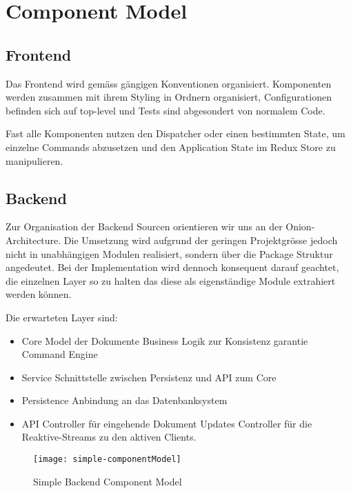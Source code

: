 \section{Component Model}



\subsection{Frontend}
Das Frontend wird gemäss gängigen Konventionen organisiert.
Komponenten werden zusammen mit ihrem Styling in Ordnern organisiert, Configurationen befinden sich auf top-level und Tests sind abgesondert von normalem Code.

Fast alle Komponenten nutzen den Dispatcher oder einen bestimmten State, um einzelne Commands abzusetzen und den Application State im Redux Store zu manipulieren.

\subsection{Backend}
Zur Organisation der Backend Sourcen orientieren wir uns an der Onion-Architecture.
Die Umsetzung wird aufgrund der geringen Projektgrösse jedoch nicht in unabhängigen Modulen realisiert, sondern über die Package Struktur angedeutet.
Bei der Implementation wird dennoch konsequent darauf geachtet, die einzelnen Layer so zu halten das diese als eigenständige Module extrahiert werden können.

Die erwarteten Layer sind:
\begin{itemize}
    \item Core
    \subitem Model der Dokumente
    \subitem Business Logik zur Konsistenz garantie
    \subitem Command Engine
    \item Service
    \subitem Schnittstelle zwischen Persistenz und API zum Core
    \item Persistence
    \subitem Anbindung an das Datenbanksystem
    \item API
    \subitem Controller für eingehende Dokument Updates
    \subitem Controller für die Reaktive-Streams zu den aktiven Clients.
\end{itemize}

\begin{figure}
    \texttt{[image: simple-componentModel]}
    \caption{Simple Backend Component Model}
\end{figure}
